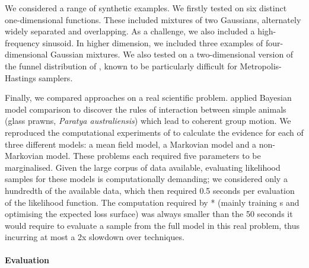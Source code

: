 \documentclass{article}
\begin{document}
We considered a range of synthetic examples. We firstly tested on six distinct one-dimensional functions. These included mixtures of two Gaussians, alternately widely separated and overlapping. As a challenge, we also included a high-frequency sinusoid. In higher dimension, we included three examples of four-dimensional Gaussian mixtures. We also tested on a two-dimensional version of the funnel distribution of \citet{neal2003slice}, known to be particularly difficult for Metropolis-Hastings samplers.

Finally, we compared approaches on a real scientific problem. 
\citet{mann2012multi} applied Bayesian model comparison to discover the rules of interaction between simple animals (glass prawns, {\it Paratya australiensis}) which lead to coherent group motion. We reproduced the computational experiments of \citet{mann2012multi} to calculate the evidence for each of three different models: a mean field model, a Markovian model and a non-Markovian model. These problems each required five parameters to be marginalised.  Given the large corpus of data available, evaluating likelihood samples for these models is computationally demanding; we considered only a hundredth of the available data, which then required 0.5 seconds per evaluation of the likelihood function.  The computation required by * (mainly training \gp s and optimising the expected loss surface) was always smaller than the 50 seconds it would require to evaluate a sample from the full model in this real problem, thus incurring at most a 2x slowdown over  techniques. 




\paragraph{Evaluation}
\end{document}
